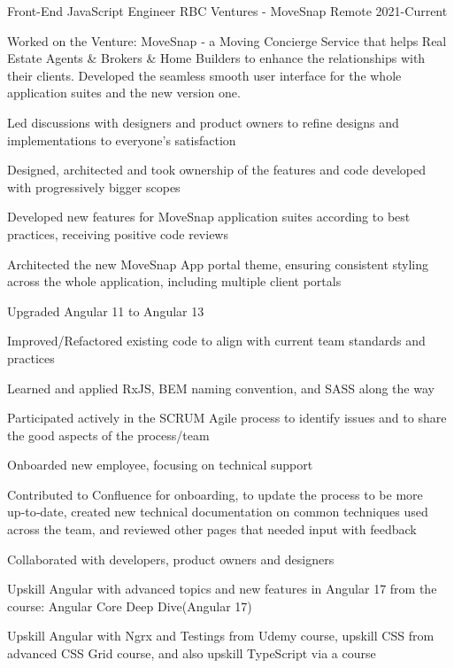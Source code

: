 

\begin{cventries}
	
	
  \cventry
{Front-End JavaScript Engineer} %
{RBC Ventures - MoveSnap} %
{Remote} %
{2021-Current} %
{Worked on the Venture: MoveSnap ‑ a Moving Concierge Service that helps Real Estate Agents \& Brokers \& Home Builders to enhance the relationships with their clients. Developed the seamless smooth user interface for the whole application suites and the new version one.
	\vspace{6.0mm}
	\begin{cvitems}
		\item
		{Led discussions with designers and product owners to refine designs and implementations to everyone’s satisfaction}
		\item
		{Designed, architected and took ownership of the features and code developed with progressively bigger scopes}
		\item
		{Developed new features for MoveSnap application suites according to best practices, receiving positive code reviews}
		\item
		{Architected the new MoveSnap App portal theme, ensuring consistent styling across the whole application, including multiple client portals}
		\item
		{Upgraded Angular 11 to Angular 13}
		\item
		{Improved/Refactored existing code to align with current team standards and practices}
		\item
		{Learned and applied RxJS, BEM naming convention, and SASS along the way}
		\item
		{Participated actively in the SCRUM Agile process to identify issues and to share the good aspects of the process/team}
		\item
		{Onboarded new employee, focusing on technical support}
		\item
		{Contributed to Confluence for onboarding, to update the process to be more up‑to‑date, created new technical documentation on common techniques used across the team, and reviewed other pages that needed input with feedback}
		\item
		{Collaborated with developers, product owners and designers}
		\item
		{Upskill Angular with advanced topics and new features in Angular 17 from the course: Angular Core Deep Dive(Angular 17)}
		\item
		{Upskill Angular with Ngrx and Testings from Udemy course, upskill CSS from advanced CSS Grid course, and also upskill TypeScript via a course}
	\end{cvitems}
}





\end{cventries}
